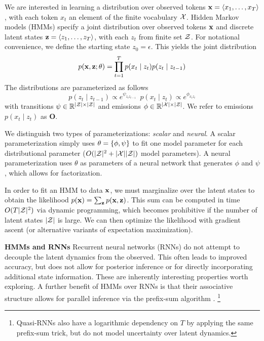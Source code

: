 \documentclass[11pt,a4paper]{article}
\begin{document}
We are interested in learning a distribution over observed tokens
$\mathbf{x} = \langle x_1, \ldots, x_T \rangle$, with each token $x_t$
an element of the finite vocabulary $\mathcal{X}$.
Hidden Markov models (HMMs) specify a joint distribution over 
observed tokens $\mathbf{x}$ and discrete latent states $\mathbf{z} = \langle z_1, \ldots, z_T \rangle$,
with each $z_t$ from finite set $\mathcal{Z}$.
For notational convenience, we define the starting state $z_0=\epsilon$.
This yields the joint distribution
\begin{equation}
p(\mathbf{x}, \mathbf{z}; \theta)
= \prod_{t=1}^T p(x_t\mid z_t)p(z_t \mid z_{t-1})
\end{equation}
\noindent The distributions are parameterized as follows
\begin{equation}
\label{param}
 p(z_t \mid z_{t-1}) \propto e^{\psi_{z_tz_{t-1}}} \; \ p(x_t \mid z_t) \propto e^{\phi_{x_tz_t}}
\end{equation}
with transitions $\psi \in \mathbb{R}^{|\mathcal{Z}|\times|\mathcal{Z}|}$
and emissions $\phi \in \mathbb{R}^{|\mathcal{X}| \times |\mathcal{Z}|}$.
We refer to emissions $p(x_t \mid z_t)$ as $\mathbf{O}$.

We distinguish two types of parameterizations: \textit{scalar} and \textit{neural}.
A scalar parameterization simply uses $\theta = \left\{\phi,\psi\right\}$ to fit one model parameter for
each distributional parameter ($O(|\mathcal{Z}|^2 + |\mathcal{X}||\mathcal{Z}|)$ model parameters).
A neural parameterization uses $\theta$ as parameters of a neural network
that generates $\phi$ and $\psi$, which allows for factorization. 

In order to fit an HMM to data $\mathbf{x}$,
we must marginalize over the latent states to obtain the likelihood
$p(\mathbf{x}) = \sum_{\mathbf{z}}p(\mathbf{x},\mathbf{z})$.
This sum can be computed in time $O(T|\mathcal{Z}|^2)$ via dynamic programming,
which becomes prohibitive if the number of latent states $|\mathcal{Z}|$ is large.
We can then optimize the likelihood 
with gradient ascent (or alternative variants of expectation maximization).

\noindent \textbf{HMMs and RNNs}
Recurrent neural networks (RNNs) do not attempt to decouple the latent dynamics from the observed.
This often leads to improved accuracy,
but does not allow for posterior inference or for directly incorporating additional
state information.
These are inherently interesting properties worth exploring.
A further benefit of HMMs over RNNs is that
their associative structure allows for parallel inference
via the prefix-sum algorithm \cite{ladner1980prefix}.
\footnote{Quasi-RNNs \citep{bradbury2016qrnn} also have a logarithmic dependency on $T$
by applying the same prefix-sum trick, but do not model uncertainty over
latent dynamics.}
\end{document}
